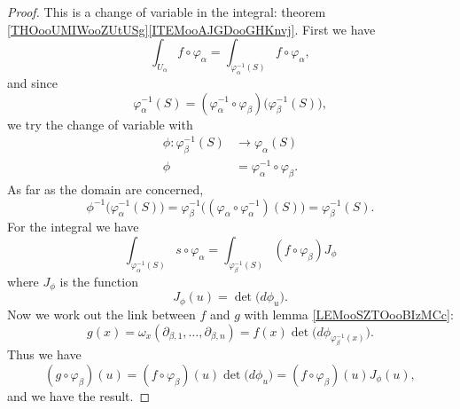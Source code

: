 \begin{proof}
	This is a change of variable in the integral: theorem \ref{THOooUMIWooZUtUSg}\ref{ITEMooAJGDooGHKnvj}. First we have
	\begin{equation}
		\int_{U_{\alpha}}f\circ \varphi_{\alpha}=\int_{\varphi_{\alpha}^{-1}(S)}f\circ \varphi_{\alpha},
	\end{equation}
	and since
	\begin{equation}
		\varphi_{\alpha}^{-1}(S)=(\varphi_{\alpha}^{-1}\circ\varphi_{\beta})\big( \varphi_{\beta}^{-1}(S) \big),
	\end{equation}
	we try the change of variable with
	\begin{equation}
		\begin{aligned}
			\phi\colon \varphi_{\beta}^{-1}(S) & \to \varphi_{\alpha}(S)                      \\
			\phi                               & =\varphi_{\alpha}^{-1}\circ \varphi_{\beta}.
		\end{aligned}
	\end{equation}
	As far as the domain are concerned,
	\begin{equation}
		\phi^{-1}\big( \varphi_{\alpha}^{-1}(S) \big)=\varphi_{\beta}^{-1}\big( (\varphi_{\alpha}\circ\varphi_{\alpha}^{-1})(S) \big)=\varphi_{\beta}^{-1}(S).
	\end{equation}
	For the integral we have
	\begin{equation}
		\int_{\varphi_{\alpha}^{-1}(S)}s\circ\varphi_{\alpha}=\int_{\varphi_{\beta}^{-1}(S)}(f\circ\varphi_{\beta})J_{\phi}
	\end{equation}
	where \( J_{\phi}\) is the function
	\begin{equation}
		J_{\phi}(u)=\det\big( d\phi_u \big).
	\end{equation}
	Now we work out the link between \( f\) and \( g\) with lemma \ref{LEMooSZTOooBIzMCc}:
	\begin{equation}
		g(x)=\omega_x(\partial_{\beta,1},\ldots,\partial_{\beta,n})=f(x)\det\big( d\phi_{\varphi_{\beta}^{-1}(x)} \big).
	\end{equation}
	Thus we have
	\begin{equation}
		(g\circ\varphi_{\beta})(u)=(f\circ\varphi_{\beta})(u)\det\big( d\phi_u \big)=(f\circ\varphi_{\beta})(u)J_{\phi}(u),
	\end{equation}
	and we have the result.
\end{proof}


